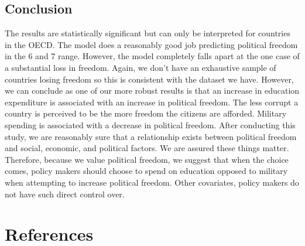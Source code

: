 \documentclass[
  english,
  man,floatsintext]{apa6}
\begin{document}
\hypertarget{conclusion}{%
\subsection{Conclusion}\label{conclusion}}

The results are statistically significant but can only be interpreted for countries in the OECD. The model does a reasonably good job predicting political freedom in the 6 and 7 range. However, the model completely falls apart at the one case of a substantial loss in freedom. Again, we don't have an exhaustive sample of countries losing freedom so this is consistent with the dataset we have. However, we can conclude as one of our more robust results is that an increase in education expenditure is associated with an increase in political freedom. The less corrupt a country is perceived to be the more freedom the citizens are afforded. Military spending is associated with a decrease in political freedom.
After conducting this study, we are reasonably sure that a relationship exists between political freedom and social, economic, and political factors. We are assured these things matter. Therefore, because we value political freedom, we suggest that when the choice comes, policy makers should choose to spend on education opposed to military when attempting to increase political freedom. Other covariates, policy makers do not have such direct control over.

\newpage

\hypertarget{references}{%
\section{References}\label{references}}

\begingroup
\setlength{\parindent}{-0.5in}
\setlength{\leftskip}{0.5in}
\end{document}
